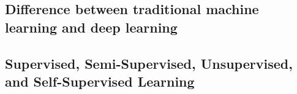 




\subsection{Difference between traditional machine learning and deep learning}
\label{subsec:processing_signals_ml_and_dl_difference}


\lipsum[1-3]


\subsection{Supervised, Semi-Supervised, Unsupervised, and Self-Supervised Learning}
\label{subsec:processing_signals_ml_and_dl_tyes_of_learning_supervision}


